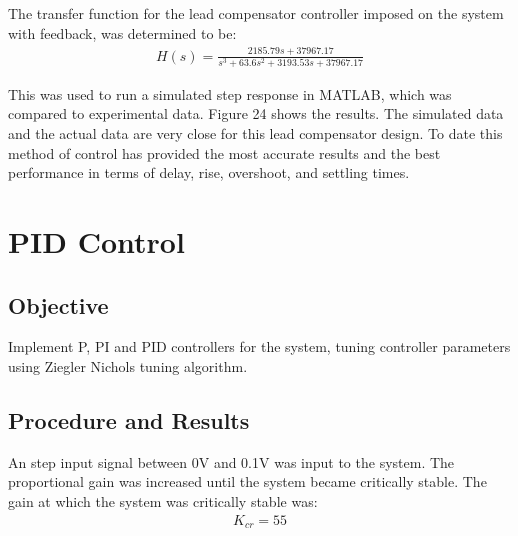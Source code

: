\documentclass{article}
\begin{document}
The transfer function for the lead compensator controller imposed on the system with feedback, was determined to be:
\begin{align*}
	H(s) = \frac{2185.79s + 37967.17}{s^3 + 63.6s^2 + 3193.53s + 37967.17}
\end{align*}

This was used to run a simulated step response in MATLAB, which was compared to experimental data. Figure 24 shows the results. The simulated data and the actual data are very close for this lead compensator design. To date this method of control has provided the most accurate results and the best performance in terms of delay, rise, overshoot, and settling times.

\section{PID Control}


\subsection{Objective}

Implement P, PI and PID controllers for the system, tuning controller parameters using Ziegler Nichols tuning algorithm.


\subsection{Procedure and Results}

An step input signal between 0$\si{\volt}$ and 0.1$\si{\volt}$ was input to the system. The proportional gain was increased until the system became critically stable. The gain at which the system was critically stable was:
\begin{align*}
	K_{cr} = 55
\end{align*}
\end{document}
